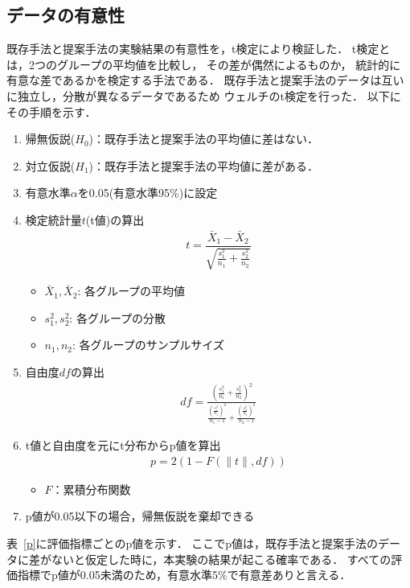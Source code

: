 \subsection{データの有意性}
 既存手法と提案手法の実験結果の有意性を，t検定により検証した．
 t検定とは，2つのグループの平均値を比較し，
 その差が偶然によるものか，
 統計的に有意な差であるかを検定する手法である．
 既存手法と提案手法のデータは互いに独立し，分散が異なるデータであるため
 ウェルチのt検定を行った．
 以下にその手順を示す．
 \begin{enumerate}
  \item 帰無仮説($H_0$)：既存手法と提案手法の平均値に差はない．
  \item 対立仮説($H_1$)：既存手法と提案手法の平均値に差がある．
  \item 有意水準$\alpha$を0.05(有意水準95\%)に設定
  \item 検定統計量$t$(t値)の算出
\begin{align}
  t = \dfrac{\bar{X}_1 - \bar{X}_2}
  {\sqrt{\frac{s_1^2}{n_1} + \frac{s_2^2}{n_2}}}
\end{align}
\begin{itemize}
  \item $\bar{X}_1, \bar{X}_2$: 各グループの平均値
  \item $s_1^2, s_2^2$: 各グループの分散
  \item $n_1, n_2$: 各グループのサンプルサイズ
\end{itemize}
\item 自由度$df$の算出
\begin{align}
 df = \frac{\left(\frac{s_1^2}{n_1} + \frac{s_2^2}{n_2}\right)^2}{\frac{\left(\frac{s_1^2}{n_1}\right)^2}
{n_1 - 1} + \frac{\left(\frac{s_2^2}{n_2}\right)^2}{n_2 - 1}}
\end{align}
\item t値と自由度を元にt分布からp値を算出
\begin{align}
  p = 2(1 - F(\|t\|,df))
\end{align}
\begin{itemize}
\item $F$：累積分布関数
\end{itemize}
\item p値が0.05以下の場合，帰無仮説を棄却できる
\end{enumerate}
表~\ref{p}に評価指標ごとのp値を示す．
ここでp値は，既存手法と提案手法のデータに差がないと仮定した時に，本実験の結果が起こる確率である．
すべての評価指標でp値が0.05未満のため，有意水準5\%で有意差ありと言える．
